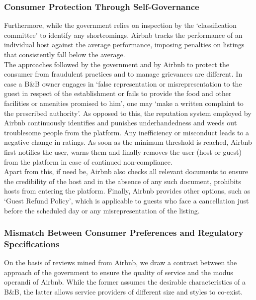 \documentclass[a4paper, 12pt]{article}
\begin{document}
               \subsubsection{Consumer Protection Through Self-Governance}
                   Furthermore, while the government relies on inspection by the ‘classification committee’ to identify any shortcomings, Airbnb tracks the performance of an individual host against the average performance, imposing penalties on listings that consistently fall below the average.\\

The approaches followed by the government and by Airbnb to protect the consumer from fraudulent practices and to manage grievances are different. In case a B\&B owner engages in ‘false representation or misrepresentation to the guest in respect of the establishment or fails to provide the food and other facilities or amenities promised to him’, one may ‘make a written complaint to the prescribed authority’. As opposed to this, the reputation system employed by Airbnb continuously identifies and punishes underhandedness and weeds out troublesome people from the platform. Any inefficiency or misconduct leads to a negative change in ratings. As soon as the minimum threshold is reached, Airbnb first notifies the user, warns them and finally removes the user (host or guest) from the platform in case of continued non-compliance. \\

Apart from this, if need be, Airbnb also checks all relevant documents to ensure the credibility of the host and in the absence of any such document, prohibits hosts from entering the platform. Finally, Airbnb provides other options, such as ‘Guest Refund Policy’, which is applicable to guests who face a cancellation just before the scheduled day or any misrepresentation of the listing.\\

\subsubsection{Mismatch Between Consumer Preferences and Regulatory Specifications}
On the basis of reviews mined from Airbnb, we draw a contrast between the approach of the government to ensure the quality of service and the modus operandi of Airbnb. While the former assumes the desirable characteristics of a B\&B, the latter allows service providers of different size and styles to co-exist. \\
\end{document}

